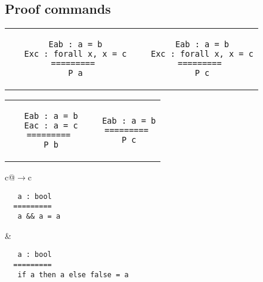 \begin{landscape}
\begin{small}
\begin{multicols*}{3}[\begin{center}\section*{}\end{center}]
\subsection*{Proof commands}
  \begin{tabular}{c@{$\to$}c}
  \begin{minipage}{0.15\textwidth}\begin{lstlisting}
   Eab : a = b
   Exc : forall x, x = c
  =========
   P a
  \end{lstlisting}\end{minipage}
  &
  \begin{minipage}{0.15\textwidth}\begin{lstlisting}
   Eab : a = b
   Exc : forall x, x = c
  =========
   P c
  \end{lstlisting}\end{minipage}
  \end{tabular}
  \begin{tabular}{c@{$\to$}c}
  \begin{minipage}{0.15\textwidth}\begin{lstlisting}
   Eab : a = b
   Eac : a = c
  =========
   P b
  \end{lstlisting}\end{minipage}
  &
  \begin{minipage}{0.15\textwidth}\begin{lstlisting}
   Eab : a = b
  =========
   P c
  \end{lstlisting}\end{minipage}
  \end{tabular}
  \begin{tabular}{c@{$\to$}c}
  \begin{minipage}{0.15\textwidth}\begin{lstlisting}
   a : bool
  =========
   a && a = a
  \end{lstlisting}\end{minipage}
  &
  \begin{minipage}{0.15\textwidth}\begin{lstlisting}
   a : bool
  =========
   if a then a else false = a
  \end{lstlisting}\end{minipage}

\end{tabular}
\end{multicols*}
\end{small}
\end{landscape}
